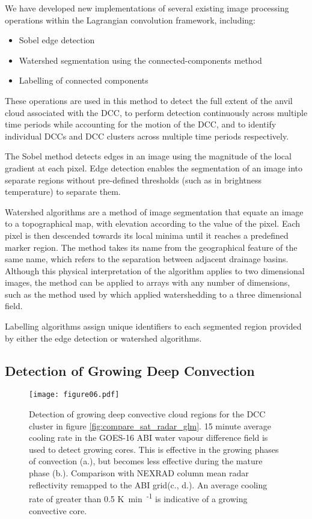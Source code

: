We have developed new implementations of several existing image processing operations within the Lagrangian convolution framework, including:
\begin{itemize}
    \item Sobel edge detection \citep{sobel_isotropic_2014}
    \item Watershed segmentation using the connected-components method \citep{bieniek_efficient_2000}
    \item Labelling of connected components \citep{hoshen_percolation_1976}
\end{itemize}

These operations are used in this method to detect the full extent of the anvil cloud associated with the DCC, to perform detection continuously across multiple time periods while accounting for the motion of the DCC, and to identify individual DCCs and DCC clusters across multiple time periods respectively.

The Sobel method detects edges in an image using the magnitude of the local gradient at each pixel.
Edge detection enables the segmentation of an image into separate regions without pre-defined thresholds (such as in brightness temperature) to separate them.

Watershed algorithms are a method of image segmentation that equate an image to a topographical map, with elevation according to the value of the pixel.
Each pixel is then descended towards its local minima until it reaches a predefined marker region.
The method takes its name from the geographical feature of the same name, which refers to the separation between adjacent drainage basins.
Although this physical interpretation of the algorithm applies to two dimensional images, the method can be applied to arrays with any number of dimensions, such as the method used by \citet{fiolleau_algorithm_2013} which applied watershedding to a three dimensional field.

Labelling algorithms assign unique identifiers to each segmented region provided by either the edge detection or watershed algorithms.

\subsection{Detection of Growing Deep Convection}

\begin{figure*}[t]
    \texttt{[image: figure06.pdf]}
    \caption{Detection of growing deep convective cloud regions for the DCC cluster in figure \ref{fig:compare_sat_radar_glm}. 15 minute average cooling rate in the GOES-16 ABI water vapour difference field is used to detect growing cores. This is effective in the growing phases of convection (a.), but becomes less effective during the mature phase (b.). Comparison with NEXRAD column mean radar reflectivity remapped to the ABI grid(c., d.). An average cooling rate of greater than 0.5 \unit{K min\textsuperscript{-1}} is indicative of a growing convective core.}
    \label{fig:core_detection}
\end{figure*}

